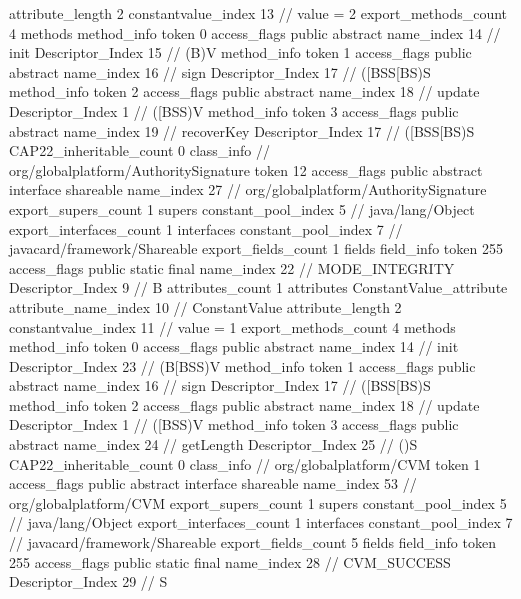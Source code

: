 {{{{{{{					attribute_length	2
					constantvalue_index	13		// value = 2
				}
				}
			}
			}
			export_methods_count	4
			methods {
				method_info {
					token	0
					access_flags	public abstract
					name_index	14		// init
					Descriptor_Index	15		// (B)V
				}
				method_info {
					token	1
					access_flags	public abstract
					name_index	16		// sign
					Descriptor_Index	17		// ([BSS[BS)S
				}
				method_info {
					token	2
					access_flags	public abstract
					name_index	18		// update
					Descriptor_Index	1		// ([BSS)V
				}
				method_info {
					token	3
					access_flags	public abstract
					name_index	19		// recoverKey
					Descriptor_Index	17		// ([BSS[BS)S
				}
			}
			CAP22_inheritable_count	0
		}
		class_info {		// org/globalplatform/AuthoritySignature
			token	12
			access_flags	public abstract interface shareable
			name_index	27		// org/globalplatform/AuthoritySignature
			export_supers_count	1
			supers {
				constant_pool_index	5		// java/lang/Object
			}
			export_interfaces_count	1
			interfaces {
				constant_pool_index	7		// javacard/framework/Shareable
			}
			export_fields_count	1
			fields {
			field_info {
				token	255
				access_flags	public static final
				name_index	22		// MODE_INTEGRITY
				Descriptor_Index	9		// B
				attributes_count	1
				attributes {
				ConstantValue_attribute {
					attribute_name_index	10		// ConstantValue
					attribute_length	2
					constantvalue_index	11		// value = 1
				}
				}
			}
			}
			export_methods_count	4
			methods {
				method_info {
					token	0
					access_flags	public abstract
					name_index	14		// init
					Descriptor_Index	23		// (B[BSS)V
				}
				method_info {
					token	1
					access_flags	public abstract
					name_index	16		// sign
					Descriptor_Index	17		// ([BSS[BS)S
				}
				method_info {
					token	2
					access_flags	public abstract
					name_index	18		// update
					Descriptor_Index	1		// ([BSS)V
				}
				method_info {
					token	3
					access_flags	public abstract
					name_index	24		// getLength
					Descriptor_Index	25		// ()S
				}
			}
			CAP22_inheritable_count	0
		}
		class_info {		// org/globalplatform/CVM
			token	1
			access_flags	public abstract interface shareable
			name_index	53		// org/globalplatform/CVM
			export_supers_count	1
			supers {
				constant_pool_index	5		// java/lang/Object
			}
			export_interfaces_count	1
			interfaces {
				constant_pool_index	7		// javacard/framework/Shareable
			}
			export_fields_count	5
			fields {
			field_info {
				token	255
				access_flags	public static final
				name_index	28		// CVM_SUCCESS
				Descriptor_Index	29		// S
}}}}}
